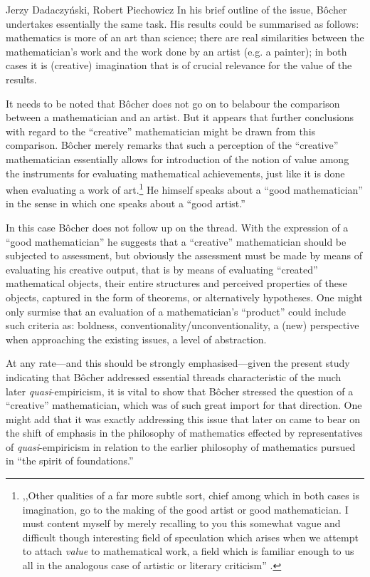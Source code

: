 \begin{artengenv}{Jerzy Dadaczyński, Robert Piechowicz}
In his brief outline of the issue, Bôcher undertakes essentially the same task. His results could be summarised as follows: mathematics is more of an art than science; there are real similarities between the mathematician's work and the work done by an artist (e.g. a painter); in both cases it is (creative) imagination that is of crucial relevance for the value of the results.

It needs to be noted that Bôcher does not go on to belabour the comparison between a mathematician and an artist. But it appears that further conclusions with regard to the ``creative'' mathematician might be drawn from this comparison. Bôcher merely remarks that such a perception of the ``creative'' mathematician essentially allows for introduction of the notion of value among the instruments for evaluating mathematical achievements, just like it is done when evaluating a work of art.\footnote{,,Other qualities of a far more subtle sort, chief among which in both cases is imagination, go to the making of the good artist or good mathematician. I must content myself by merely recalling to you this somewhat vague and difficult though interesting field of speculation which arises when we attempt to attach \textit{value} to mathematical work, a field which is familiar enough to us all in the analogous case of artistic or literary criticism''
\parencite[][p.133]{bocher_fundamental_1904}.%
} He himself speaks about a ``good mathematician'' in the sense in which one speaks about a ``good artist.''

In this case Bôcher does not follow up on the thread. With the expression of a ``good mathematician'' he suggests that a ``creative'' mathematician should be subjected to assessment, but obviously the assessment must be made by means of evaluating his creative output, that is by means of evaluating ``created'' mathematical objects, their entire structures and perceived properties of these objects, captured in the form of theorems, or alternatively hypotheses. One might only surmise that an evaluation of a mathematician's ``product'' could include such criteria as: boldness, conventionality/unconventionality, a (new) perspective when approaching the existing issues, a level of abstraction.

At any rate---and this should be strongly emphasised---given the present study indicating that Bôcher addressed essential threads characteristic of the much later \textit{quasi}-empiricism, it is vital to show that Bôcher stressed the question of a ``creative'' mathematician, which was of such great import for that direction. One might add that it was exactly addressing this issue that later on came to bear on the shift of emphasis in the philosophy of mathematics effected by representatives of \textit{quasi}-empiricism in relation to the earlier philosophy of mathematics pursued in ``the spirit of foundations.''


\end{artengenv}
